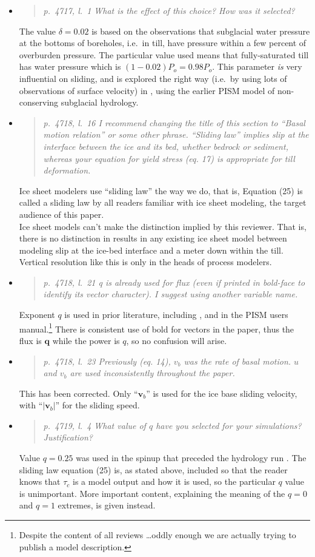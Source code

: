 \documentclass[11pt,reqno]{amsart}
\newcommand{\reply}[2]{
\medskip\medskip
\item  \begin{quote}
\emph{#1}
\end{quote}

\medskip
\noindent #2}
\begin{document}
\begin{itemize}
\reply{p.~4717, l.~1 What is the effect of this choice? How was it selected?}
{The value $\delta=0.02$ is based on the observations that subglacial water pressure at the bottoms of boreholes, i.e.~in till, have pressure within a few percent of overburden pressure.  The particular value used means that fully-saturated till has water pressure which is $(1-0.02)P_o=0.98 P_o$.  This parameter \emph{is} very influential on sliding, and is explored the right way (i.e.~by using lots of observations of surface velocity) in \cite{AschwandenAdalgeirsdottirKhroulev}, using the earlier PISM model of non-conserving subglacial hydrology.}

\reply{p.~4718, l.~16 I recommend changing the title of this section to ``Basal motion relation'' or some other phrase. ``Sliding law'' implies slip at the interface between the ice and its bed, whether bedrock or sediment, whereas your equation for yield stress (eq. 17) is appropriate for till deformation.}
{Ice sheet modelers use ``sliding law'' the way we do, that is, Equation (25) is called a sliding law by all readers familiar with ice sheet modeling, the target audience of this paper. \\
\indent  Ice sheet models can't make the distinction implied by this reviewer.  That is, there is no distinction in results in any existing ice sheet model between modeling slip at the ice-bed interface and a meter down within the till.  Vertical resolution like this is only in the heads of process modelers.}

\reply{p.~4718, l.~21 q is already used for flux (even if printed in bold-face to identify its vector character).  I suggest using another variable name.}
{Exponent $q$ is used in prior literature, including \cite{AschwandenAdalgeirsdottirKhroulev}, and in the PISM users manual.\footnote{Despite the content of all reviews \dots oddly enough we are actually trying to publish a model description.}  There is consistent use of bold for vectors in the paper, thus the flux is $\mathbf{q}$ while the power is $q$, so no confusion will arise.}

\reply{p.~4718, l.~23 Previously (eq. 14), $v_b$ was the rate of basal motion. $u$ and $v_b$ are used inconsistently throughout the paper.}
{This has been corrected.  Only ``$\mathbf{v}_b$'' is used for the ice base sliding velocity, with ``$|\mathbf{v}_b|$'' for the sliding speed.}

\reply{p.~4719, l.~4 What value of $q$ have you selected for your simulations? Justification?}
{Value $q=0.25$ was used in the spinup that preceded the hydrology run \cite{AschwandenAdalgeirsdottirKhroulev}.  The sliding law equation (25) is, as stated above, included so that the reader knows that $\tau_c$ is a model output and how it is used, so the particular $q$ value is unimportant.  More important content, explaining the meaning of the $q=0$ and $q=1$ extremes, is given instead.}


\end{itemize}
\end{document}
